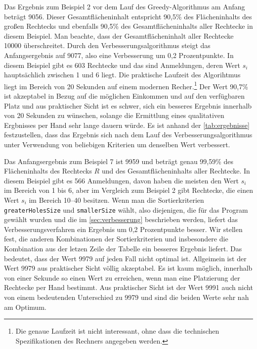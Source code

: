 Das Ergebnis zum Beispiel 2 vor dem Lauf des Greedy-Algorithmus am Anfang 
beträgt 9056. Dieser Gesamtflächeninhalt entspricht 90,5\% des Flächeninhalts des
großen Rechtecks und ebenfalls 90,5\% des Gesamtflächeninhalts aller Rechtecke in diesem Beispiel.
Man beachte, dass der Gesamtflächeninhalt aller Rechtecke 10000 überschreitet.
Durch den Verbesserungsalgorithmus steigt das Anfangsergebnis auf 9077,
also eine Verbesserung um 0,2 Prozentpunkte.
In diesem Beispiel gibt es 603 Rechtecke und das sind Anmeldungen, deren Wert $s_i$ hauptsächlich zwischen 
1 und 6 liegt. Die praktische Laufzeit des Algorihtmus liegt im Bereich von 20 Sekunden
auf einem modernen Recher.\footnote{Die genaue Laufzeit ist nicht interessant, ohne dass die 
technischen Spezifikationen des Rechners angegeben werden.}
Der Wert 90,7\% ist akzeptabel in Bezug auf die möglichen Einkommen und auf den verfügbaren Platz
und aus praktischer Sicht ist es schwer, sich ein besseres Ergebnis innerhalb von 20 Sekunden zu wünschen,
solange die Ermittlung eines qualitativen Ergbnisses per Hand sehr lange dauern würde.
Es ist anhand der \cref{tab:ergebnisse} festzustellen, dass das Ergebnis sich nach dem Lauf des
Verbesserungsalgorithmus unter Verwendung von beliebigen Kriterien um denselben Wert verbessert.

Das Anfangsergebnis zum Beispiel 7 ist 9959 und beträgt genau 99,59\% des Flächeninhalts
des Rechtecks $R$ und des Gesamtflächeninhalts aller Rechtecke. In diesem Beispiel
gibt es 566 Anmeldungen, davon haben die meisten den Wert $s_i$ im Bereich von 1 bis 6, aber
im Vergleich zum Beispiel 2 gibt Rechtecke, die einen Wert $s_i$ im Bereich 10--40 besitzen.
Wenn man die Sortierkriterien \texttt{greaterHolesSize} und \texttt{smallerSize} wählt,
also diejenigen, die für das Program gewählt wurden und die im \cref{sec:verbesserung} beschrieben werden,
liefert das Verbesserungsverfahren ein Ergebnis um 0,2 Prozentpunkte besser.
Wir stellen fest, die anderen Kombinationen der Sortierkriterien und insbesondere die Kombination
aus der letzen Zeile der Tabelle ein besseres Ergebnis liefert.
Das bedeutet, dass der Wert 9979 auf jeden Fall nicht optimal ist. 
Allgeimein ist der Wert 9979 aus praktischer Sicht völlig akzeptabel.
Es ist kaum möglich, innerhalb von einer Sekunde so einen Wert zu erreichen,
wenn man eine Platzierung der Rechtecke per Hand bestimmt.
Aus praktischer Sicht ist der Wert 9991 auch nicht von einem bedeutenden Unterschied zu 9979 und
sind die beiden Werte sehr nah am Optimum.

